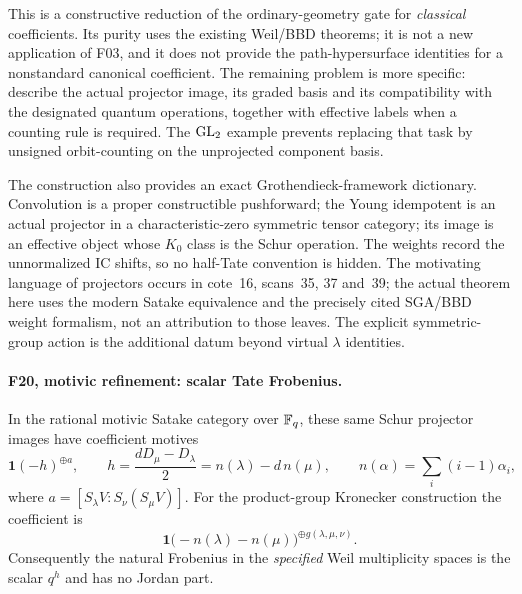 \documentclass[11pt,a4paper]{article}
\newcommand{\fid}[1]{\textsf{#1}}\newcommand{\gate}[1]{\textsf{#1}}
\theoremstyle{named}\newtheorem{finding}{Finding}[section]
\theoremstyle{definition}\newtheorem{definition}[finding]{Definition}
\theoremstyle{remark}\newtheorem{remark}[finding]{Remark}
\begin{document}
This is a constructive reduction of the ordinary-geometry gate for \emph{classical} coefficients. Its purity uses the existing Weil/BBD theorems; it is not a new application of \fid{F03}, and it does not provide the path-hypersurface identities for a nonstandard canonical coefficient. The remaining problem is more specific: describe the actual projector image, its graded basis and its compatibility with the designated quantum operations, together with effective labels when a counting rule is required. The $\mathrm{GL}_2$ example prevents replacing that task by unsigned orbit-counting on the unprojected component basis.

The construction also provides an exact Grothendieck-framework dictionary. Convolution is a proper constructible pushforward; the Young idempotent is an actual projector in a characteristic-zero symmetric tensor category; its image is an effective object whose $K_0$ class is the Schur operation. The weights record the unnormalized IC shifts, so no half-Tate convention is hidden. The motivating language of projectors occurs in cote~16, scans~35, 37 and~39; the actual theorem here uses the modern Satake equivalence and the precisely cited SGA/BBD weight formalism, not an attribution to those leaves. The explicit symmetric-group action is the additional datum beyond virtual $\lambda$ identities.

\paragraph{\fid{F20}, motivic refinement: scalar Tate Frobenius.}
In the rational motivic Satake category over $\mathbb F_q$, these same Schur
projector images have coefficient motives
\[
 \mathbf1(-h)^{\oplus a},\qquad
 h=\frac{dD_\mu-D_\lambda}{2}
   =n(\lambda)-d\,n(\mu),\qquad
 n(\alpha)=\sum_i(i-1)\alpha_i,
\]
where $a=[S_\lambda V:S_\nu(S_\mu V)]$. For the product-group Kronecker
construction the coefficient is
\[
 \mathbf1\bigl(-n(\lambda)-n(\mu)\bigr)^{\oplus g(\lambda,\mu,\nu)}.
\]
Consequently the natural Frobenius in the \emph{specified} Weil
multiplicity spaces is the scalar $q^h$ and has no Jordan part.
\end{document}
